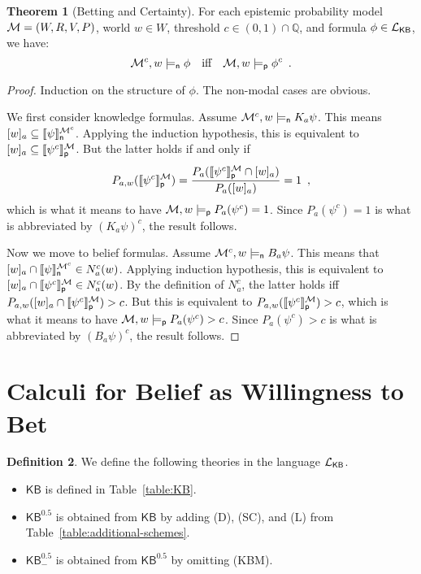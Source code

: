 \documentclass[12pt]{article}
\theoremstyle{definition}
\newtheorem{theorem}{Theorem}[section]
\newtheorem{definition}[theorem]{Definition}
\newcommand{\Rat}{\mathbb{Q}}  %
\newcommand{\M}{{\cal M}}      %
\newcommand{\Lang}{{\cal L}}   %
\newcommand{\KB}{{\mathsf{KB}}}                        %
\newcommand{\KBeq}{{\mathsf{KB}^{\mathsf{0.5}}}}       %
\newcommand{\KBeqm}{{\mathsf{KB}^{\mathsf{0.5}}_{-}}}  %
\newcommand{\modelsn}{\models_{\mathsf{n}}}                  %
\newcommand{\semn}[1]{\llbracket{#1}\rrbracket_{\mathsf{n}}} %
\newcommand{\modelsp}{\models_{\mathsf{p}}}                  %
\newcommand{\semp}[1]{\llbracket{#1}\rrbracket_{\mathsf{p}}} %
\begin{document}
\begin{theorem}[Betting and Certainty]
  \label{BettingTheorem}
  For each epistemic probability model $\M = (W,R,V,P)$, world $w \in
  W$, threshold $c\in(0,1)\cap\Rat$, and formula $\phi \in \Lang_\KB$,
  we have:
  \[
  \M^c,w \modelsn\phi \quad\text{iff}\quad \M,w \modelsp\phi^c
  \enspace.
  \]
\end{theorem}
\begin{proof}
  Induction on the structure of $\phi$. The non-modal cases are
  obvious.

  We first consider knowledge formulas. Assume $\M^c,w \modelsn
  K_a\psi$.  This means
  $[w]_a\subseteq\semn{\psi}^{\M^c}$. Applying the induction hypothesis, this is equivalent to
  $[w]_a\subseteq\semp{\psi^c}^{\M}$.  But the latter holds if and only if
  \[
  P_{a,w}(\semp{\psi^c}^\M) =
  \frac{P_a(\semp{\psi^c}^\M\cap[w]_a)}{P_a([w]_a)}=1 \enspace,
  \]
  which is what it means to have $\M,w\modelsp P_a(\psi^c)=1$.
  Since $P_a(\psi^c)=1$ is what is abbreviated by $(K_a\psi)^c$, the result follows.

  Now we move to belief formulas. Assume $\M^c,w \modelsn
  B_a\psi$.  This means that
  $[w]_a\cap\semn{\psi}^{\M^c}\in N^c_a(w)$.
  Applying induction hypothesis, this is equivalent to
  $[w]_a\cap\semp{\psi^c}^\M\in N^c_a(w)$.
  By the definition of $N^c_a$, the latter holds
  iff
  $P_{a,w}([w]_a\cap\semp{\psi^c}^\M)>c$.
  But this is equivalent to
  $P_{a,w}(\semp{\psi^c}^\M)>c$, which is 
  what it means
  to have $\M,w \modelsp P_a(\psi^c)>c$.
  Since $P_a(\psi^c)>c$ is what is abbreviated by
  $(B_a\psi)^c$, the result follows.
\end{proof}

\section{Calculi for Belief as Willingness to Bet}
\label{Section:Calculi}

\begin{definition}
  \label{definition:calculi}
  We define the following theories in the language $\Lang_\KB$.
  \begin{itemize}
  \item $\KB$ is defined in Table~\ref{table:KB}.

  \item $\KBeq$ is obtained from $\KB$ by adding (D), (SC), and (L)
    from Table~\ref{table:additional-schemes}.

  \item $\KBeqm$ is obtained from $\KBeq$ by omitting (KBM).
  \end{itemize}
\end{definition}
\end{document}
